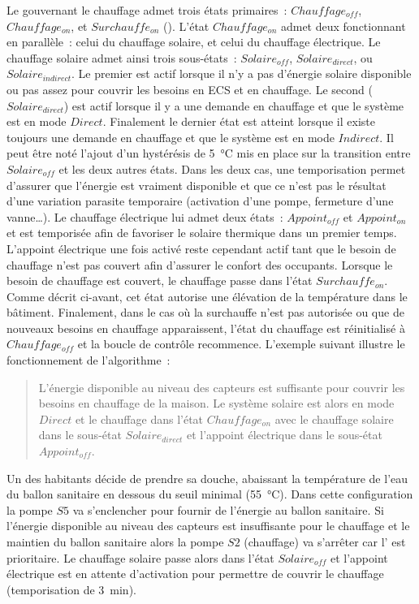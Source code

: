 Le  gouvernant le chauffage admet trois états primaires~: $Chauffage_{off}$,
$Chauffage_{on}$, et $Surchauffe_{on}$ (). L’état
$Chauffage_{on}$ admet deux  fonctionnant en parallèle~: celui du chauffage
solaire, et celui du chauffage électrique. Le chauffage solaire admet ainsi trois sous-états~:
$Solaire_{off}$, $Solaire_{direct}$, ou $Solaire_{indirect}$. Le premier est actif lorsque
il n’y a pas d’énergie solaire disponible ou pas assez pour couvrir les besoins en ECS et
en chauffage. Le second ($Solaire_{direct}$) est actif lorsque il y a une demande en
chauffage et que le système est en mode $Direct$. Finalement le dernier état est atteint
lorsque il existe toujours une demande en chauffage et que le système est en mode
$Indirect$.
Il peut être noté l’ajout d’un hystérésis de \SI{5}{\celsius} mis en place sur la
transition entre $Solaire_{off}$ et les deux autres états. Dans les deux cas, une
temporisation permet d’assurer que l’énergie est vraiment disponible et que ce n’est pas
le résultat d’une variation parasite temporaire (activation d’une pompe, fermeture d’une
vanne\dots). Le chauffage électrique lui admet deux états~: $Appoint_{off}$ et
$Appoint_{on}$ et est temporisée afin de favoriser le solaire thermique dans un premier temps.
L’appoint électrique une fois activé reste cependant actif tant que le besoin de chauffage n’est pas couvert
afin d’assurer le confort des occupants.
Lorsque le besoin de chauffage est couvert, le chauffage passe dans l’état
$Surchauffe_{on}$. Comme décrit ci-avant, cet état autorise une élévation de la température
dans le bâtiment. Finalement, dans le cas où la surchauffe n’est pas autorisée ou que de nouveaux
besoins en chauffage apparaissent, l’état du chauffage est réinitialisé à $Chauffage_{off}$
et la boucle de contrôle recommence.
L’exemple suivant illustre le fonctionnement de l’algorithme~:
\blockquote{L’énergie disponible au niveau des capteurs est suffisante pour couvrir les besoins en chauffage de
la maison. Le système solaire est alors en mode $Direct$ et le chauffage dans l’état
$Chauffage_{on}$ avec le chauffage solaire dans le sous-état $Solaire_{direct}$ et
l’appoint électrique dans le sous-état $Appoint_{off}$.}
Un des habitants décide de prendre sa douche, abaissant la température de l’eau du ballon
sanitaire en dessous du seuil minimal (\SI{55}{\celsius}). Dans cette configuration la
pompe $S5$ va s’enclencher pour fournir de l’énergie au ballon sanitaire. Si l’énergie
disponible au niveau des capteurs est insuffisante pour le chauffage et le maintien du
ballon sanitaire alors la pompe $S2$ (chauffage) va s’arrêter car l’ est prioritaire.
Le chauffage solaire passe alors dans l’état $Solaire_{off}$ et l’appoint électrique est
en attente d’activation pour permettre de couvrir le chauffage (temporisation de
\SI{3}{\minute}).

